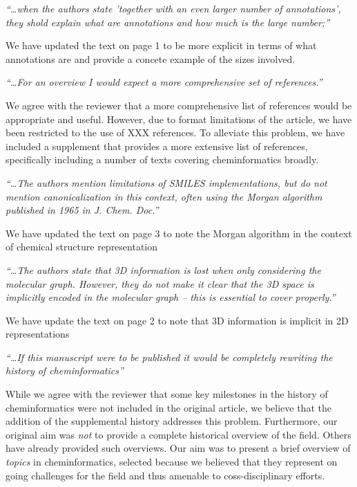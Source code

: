\documentclass[11pt,a4paper]{article}
\begin{document}
\newcommand{\comment}[1]{\textit{``\ldots #1''}\par\vspace{0.5em}}
\newcommand{\response}[1]{#1\vspace{1em}}


\comment{when the authors state 'together with an even larger number
  of annotations', they shold explain what are annotations and how
  much is the large number;} 
\response{We have updated the text on page 1 to be more explicit in
  terms of what annotations are and provide a concete example of the
  sizes involved.}

\comment{For an overview I would expect a more comprehensive set of
  references.}
\response{We agree with the reviewer that a more comprehensive list of
references would be appropriate and useful. However, due to format
limitations of the article, we have been restricted to the use of XXX
references. To alleviate this problem, we have included a supplement
that provides a more extensive list of references, specifically
including a number of texts covering cheminformatics broadly.}


\comment{The authors mention limitations of SMILES implementations,
  but do not mention canonicalization in this context, often using the
  Morgan algorithm published in 1965 in J. Chem. Doc.}
\response{We have updated the text on page 3 to note the Morgan
  algorithm in the context of chemical structure representation}

\comment{The authors state that 3D information is lost when only
  considering the molecular graph. However, they do not make it clear
  that the 3D space is implicitly encoded in the molecular graph –
  this is essential to cover properly.}
\response{We have update the text on page 2 to note that 3D
  information is implicit in 2D representations}

\comment{If this manuscript were to be published it would be
  completely rewriting the history of cheminformatics}
\response{While we agree with the reviewer that some key milestones in
  the history of cheminformatics were not included in the original
  article, we believe that the addition of the supplemental history
  addresses this problem. Furthermore, our original aim was \emph{not}
  to provide a complete historical overview of the field. Others have
  already provided such overviews. Our aim was to present a brief
  overview of \emph{topics} in cheminformatics, selected because we
  believed that they represent on going challenges for the field and
  thus amenable to coss-disciplinary efforts.}

\end{document}
